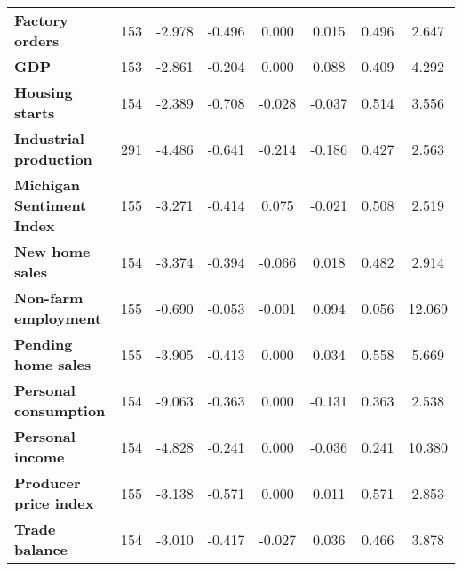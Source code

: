 \begin{landscape}
\begin{table}[]
\begin{center}
\begin{tabular}{@{}lccccccc@{}}
\textbf{Factory orders}                    & 153                      & -2.978        & -0.496           & 0.000           & 0.015         & 0.496            & 2.647         \\
\textbf{GDP}                               & 153                      & -2.861        & -0.204           & 0.000           & 0.088         & 0.409            & 4.292         \\
\textbf{Housing starts}                    & 154                      & -2.389        & -0.708           & -0.028          & -0.037        & 0.514            & 3.556         \\
\textbf{Industrial production}             & 291                      & -4.486        & -0.641           & -0.214          & -0.186        & 0.427            & 2.563         \\
\textbf{Michigan Sentiment Index}          & 155                      & -3.271        & -0.414           & 0.075           & -0.021        & 0.508            & 2.519         \\
\textbf{New home sales}                    & 154                      & -3.374        & -0.394           & -0.066          & 0.018         & 0.482            & 2.914         \\
\textbf{Non-farm employment}               & 155                      & -0.690        & -0.053           & -0.001          & 0.094         & 0.056            & 12.069        \\
\textbf{Pending home sales}                & 155                      & -3.905        & -0.413           & 0.000           & 0.034         & 0.558            & 5.669         \\
\textbf{Personal consumption}              & 154                      & -9.063        & -0.363           & 0.000           & -0.131        & 0.363            & 2.538         \\
\textbf{Personal income}                   & 154                      & -4.828        & -0.241           & 0.000           & -0.036        & 0.241            & 10.380        \\
\textbf{Producer price index}              & 155                      & -3.138        & -0.571           & 0.000           & 0.011         & 0.571            & 2.853         \\
\textbf{Trade balance}                     & 154                      & -3.010        & -0.417           & -0.027          & 0.036         & 0.466            & 3.878         \\ \bottomrule

\end{tabular}
\end{center}
\end{table}
\end{landscape}
